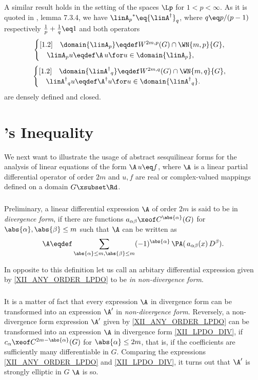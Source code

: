 \documentclass[11pt,twoside]{article}
\def\G{G}
\begin{document}
\subparagraph{} %
A similar result holds in the setting of the spaces $\Lp$ for $1 < p < \infty$.
As it is quoted in \cite{XII_Pa}, lemma 7.3.4,
we have 
${\linA_p}^* \eq {{\linA}^{\dag}}_q$,
where $q \eq p/(p-1)$ respectively $\frac{1}{p} + \frac{1}{q} \eq 1$
and both operators
\[
\begin{cases}[1.2]
\quad \domain{\linA_p} \eqdef W^{2m,p}(\G) \cap \WN{m,p}{\G},\\
\quad \linA_p u \eqdef \A\,u \for u \in \domain{\linA_p},\\
\end{cases}
\]
\[
\begin{cases}[1.2]
\quad \domain{{\linA^{\dag}}_q} \eqdef W^{2m,q}(\G) \cap \WN{m,q}{\G},\\
\quad {\linA^{\dag}}_q u \eqdef \A^{\dag} u
      \for u \in \domain{{\linA^{\dag}}_q}.\\
\end{cases}
\]
are densely defined and closed.

\section{{\GARDING}'s Inequality}
We next want to illustrate the usage of abstract sesquilinear
forms for the analysis of linear equations of the form $\A \, u \eq f$,
where $\A$ is a linear partial differential operator of order $2m$
and $u,f$ are real or complex-valued mappings
defined on a domain $\G \xsubset \Rd$.

\subparagraph{} %
Preliminary,
a linear differential expression $\A$ of order $2m$
is said to be in \textit{divergence form},
if there are functions $a_{\alpha \beta} \xeof C^{\abs{\alpha} }(\G)$
for $\abs{\alpha} , \abs{\beta} \leq m$
such that $\A$ can be written as
\begin{equation}\label{XII_LPDO_DIV}
\A \eqdef
\sum_{\abs{\alpha} \leq m, \abs{\beta} \leq m} (-1)^{\abs{\alpha} } \,
\PA(\,a_{\alpha \beta}(x) \, D^{\beta}).
\end{equation}

In opposite to this definition let us call an arbitary differential expression
given by \eqref{XII_ANY_ORDER_LPDO} to be \textit{in non-divergence form}.

\subparagraph{} %
It is a matter of fact
that every expression $\A$ in divergence form
can be transformed into an expression $\A'$ in \textit{non-divergence form}.
Reversely,
a non-divergence form expression $\A'$ given by \eqref{XII_ANY_ORDER_LPDO}
can be transformed into an expression $\A$ in divergence form \eqref{XII_LPDO_DIV},
if $c_{\alpha} \xeof C^{2m - \abs{\alpha} }(\G)$ for $\abs{\alpha} \leq 2m$,
that is,
if the coefficients are sufficiently many differentiable in $\G$.
Comparing the expressions \eqref{XII_ANY_ORDER_LPDO} and \eqref{XII_LPDO_DIV},
it turns out that
$\A'$ is strongly elliptic in $\G$ \iff $\A$ is so.
\end{document}
